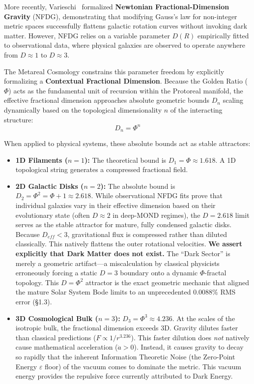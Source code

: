 More recently, Varieschi~\cite{varieschi2020} formalized \textbf{Newtonian Fractional-Dimension Gravity} (NFDG), demonstrating that modifying Gauss's law for non-integer metric spaces successfully flattens galactic rotation curves without invoking dark matter. However, NFDG relies on a variable parameter $D(R)$ empirically fitted to observational data, where physical galaxies are observed to operate anywhere from $D \approx 1$ to $D \approx 3$.

The Metareal Cosmology constrains this parameter freedom by explicitly formalizing a \textbf{Contextual Fractional Dimension}. Because the Golden Ratio ($\Phi$) acts as the fundamental unit of recursion within the Protoreal manifold, the effective fractional dimension approaches absolute geometric bounds $D_n$ scaling dynamically based on the topological dimensionality $n$ of the interacting structure:
\begin{equation}
    D_n = \Phi^n
\end{equation}

When applied to physical systems, these absolute bounds act as stable attractors:
\begin{itemize}
    \item \textbf{1D Filaments ($n=1$):} The theoretical bound is $D_1 = \Phi \approx 1.618$. A 1D topological string generates a compressed fractional field.
    \item \textbf{2D Galactic Disks ($n=2$):} The absolute bound is $D_2 = \Phi^2 = \Phi + 1 \approx 2.618$. While observational NFDG fits prove that individual galaxies vary in their effective dimension based on their evolutionary state (often $D \approx 2$ in deep-MOND regimes), the $D = 2.618$ limit serves as the stable attractor for mature, fully condensed galactic disks. Because $D_{eff} < 3$, gravitational flux is compressed rather than diluted classically. This natively flattens the outer rotational velocities. \textbf{We assert explicitly that Dark Matter does not exist.} The ``Dark Sector'' is merely a geometric artifact---a miscalculation by classical physicists erroneously forcing a static $D=3$ boundary onto a dynamic $\Phi$-fractal topology. This $D = \Phi^2$ attractor is the exact geometric mechanic that aligned the mature Solar System Bode limits to an unprecedented $0.0088\%$ RMS error (\S 1.3). 
    \item \textbf{3D Cosmological Bulk ($n=3$):} $D_3 = \Phi^3 \approx 4.236$. At the scales of the isotropic bulk, the fractional dimension exceeds 3D. Gravity dilutes faster than classical predictions ($F \propto 1/r^{3.236}$). This faster dilution does \emph{not} natively cause mathematical acceleration ($\ddot{a} > 0$). Instead, it causes gravity to decay so rapidly that the inherent Information Theoretic Noise (the Zero-Point Energy $\varepsilon$ floor) of the vacuum comes to dominate the metric. This vacuum energy provides the repulsive force currently attributed to Dark Energy.
\end{itemize}

